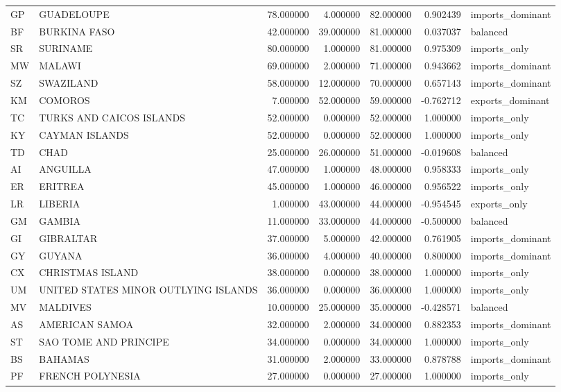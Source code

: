 \begin{tabular}{llrrrrl}
GP & GUADELOUPE & 78.000000 & 4.000000 & 82.000000 & 0.902439 & imports\_dominant \\
BF & BURKINA FASO & 42.000000 & 39.000000 & 81.000000 & 0.037037 & balanced \\
SR & SURINAME & 80.000000 & 1.000000 & 81.000000 & 0.975309 & imports\_only \\
MW & MALAWI & 69.000000 & 2.000000 & 71.000000 & 0.943662 & imports\_dominant \\
SZ & SWAZILAND & 58.000000 & 12.000000 & 70.000000 & 0.657143 & imports\_dominant \\
KM & COMOROS & 7.000000 & 52.000000 & 59.000000 & -0.762712 & exports\_dominant \\
TC & TURKS AND CAICOS ISLANDS & 52.000000 & 0.000000 & 52.000000 & 1.000000 & imports\_only \\
KY & CAYMAN ISLANDS & 52.000000 & 0.000000 & 52.000000 & 1.000000 & imports\_only \\
TD & CHAD & 25.000000 & 26.000000 & 51.000000 & -0.019608 & balanced \\
AI & ANGUILLA & 47.000000 & 1.000000 & 48.000000 & 0.958333 & imports\_only \\
ER & ERITREA & 45.000000 & 1.000000 & 46.000000 & 0.956522 & imports\_only \\
LR & LIBERIA & 1.000000 & 43.000000 & 44.000000 & -0.954545 & exports\_only \\
GM & GAMBIA & 11.000000 & 33.000000 & 44.000000 & -0.500000 & balanced \\
GI & GIBRALTAR & 37.000000 & 5.000000 & 42.000000 & 0.761905 & imports\_dominant \\
GY & GUYANA & 36.000000 & 4.000000 & 40.000000 & 0.800000 & imports\_dominant \\
CX & CHRISTMAS ISLAND & 38.000000 & 0.000000 & 38.000000 & 1.000000 & imports\_only \\
UM & UNITED STATES MINOR OUTLYING ISLANDS & 36.000000 & 0.000000 & 36.000000 & 1.000000 & imports\_only \\
MV & MALDIVES & 10.000000 & 25.000000 & 35.000000 & -0.428571 & balanced \\
AS & AMERICAN SAMOA & 32.000000 & 2.000000 & 34.000000 & 0.882353 & imports\_dominant \\
ST & SAO TOME AND PRINCIPE & 34.000000 & 0.000000 & 34.000000 & 1.000000 & imports\_only \\
BS & BAHAMAS & 31.000000 & 2.000000 & 33.000000 & 0.878788 & imports\_dominant \\
PF & FRENCH POLYNESIA & 27.000000 & 0.000000 & 27.000000 & 1.000000 & imports\_only \\

\end{tabular}
